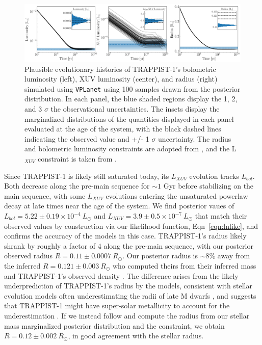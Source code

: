 \documentclass[twocolumn]{aastex62}
\newcommand{\vplanet}[0]{\texttt{VPLanet}\xspace}
\begin{document}
\begin{figure}[t]
	\includegraphics[width=\textwidth]{../Analysis/Evol/trappist1Evol.pdf}
   \caption{Plausible evolutionary histories of TRAPPIST-1's bolometric luminosity (left), XUV luminosity (center), and radius (right) simulated using \vplanet using 100 samples drawn from the posterior distribution. In each panel, the blue shaded regions display the 1, 2, and 3 $\sigma$ the observational uncertainties. The insets display the marginalized distributions of the quantities displayed in each panel evaluated at the age of the system, with the black dashed lines indicating the observed value and +/- 1 $\sigma$ uncertainty. The radius and bolometric luminosity constraints are adopted from \citet{vanGrootel2018}, and the L$_{XUV}$ constraint is taken from \citet{Wheatley2017}.}%
    \label{fig:evol}%
\end{figure}

Since TRAPPIST-1 is likely still saturated today, its $L_{XUV}$ evolution tracks $L_{bol}$. Both decrease along the pre-main sequence for ${\sim}1$ Gyr before stabilizing on the main sequence, with some $L_{XUV}$ evolutions entering the unsaturated powerlaw decay at late times near the age of the system. We find posterior vaues of $L_{bol} = 5.22 \pm{0.19} \times 10^{-4} \ L_{\odot}$ and $L_{XUV} = 3.9 \pm{0.5} \times 10^{-7} \ L_{\odot}$ that match their observed values by construction via our likelihood function, Eqn~\ref{eqn:lnlike}, and confirms the accuracy of the \citet{Baraffe2015} models in this case. TRAPPIST-1's radius likely shrank by roughly a factor of 4 along the pre-main sequence, with our posterior observed radius $R = 0.11 \pm{0.0007} \ R_{\odot}$. Our posterior radius is ${\sim} 8\%$ away from the inferred \citet{vanGrootel2018} $R = 0.121 \pm {0.003} \ R_{\odot}$ who computed theirs from their inferred mass and TRAPPIST-1's observed density \citep{Delrez2018}. The difference arises from the likely underprediction of TRAPPIST-1's radius by the \citet{Baraffe2015} models, consistent with stellar evolution models often underestimating the radii of late M dwarfs \citep{Reid2005,Spada2013,Jackson2019}, and suggests that TRAPPIST-1 might have super-solar metallicity to account for the underestimation \citep{Burgasser2017,vanGrootel2018}. If we instead follow \citet{vanGrootel2018} and compute the radius from our stellar mass marginalized posterior distribution and the \citet{Delrez2018} constraint, we obtain $R = 0.12 \pm{0.002} \ R_{\odot}$, in good agreement with the \citet{vanGrootel2018} stellar radius.
\end{document}
